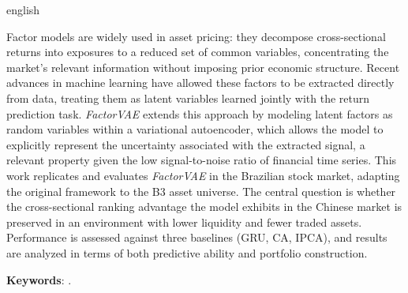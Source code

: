 \begin{resumo}[Abstract]
\begin{otherlanguage*}{english}

Factor models are widely used in asset pricing: they decompose cross-sectional returns into exposures to a reduced set of common variables, concentrating the market's relevant information without imposing prior economic structure. Recent advances in machine learning have allowed these factors to be extracted directly from data, treating them as latent variables learned jointly with the return prediction task. \textit{FactorVAE} extends this approach by modeling latent factors as random variables within a variational autoencoder, which allows the model to explicitly represent the uncertainty associated with the extracted signal, a relevant property given the low signal-to-noise ratio of financial time series. This work replicates and evaluates \textit{FactorVAE} in the Brazilian stock market, adapting the original framework to the B3 asset universe. The central question is whether the cross-sectional ranking advantage the model exhibits in the Chinese market is preserved in an environment with lower liquidity and fewer traded assets. Performance is assessed against three baselines (GRU, CA, IPCA), and results are analyzed in terms of both predictive ability and portfolio construction.

\textbf{Keywords}: \thekeywordsabstract.

\end{otherlanguage*}
\end{resumo}

\newpage